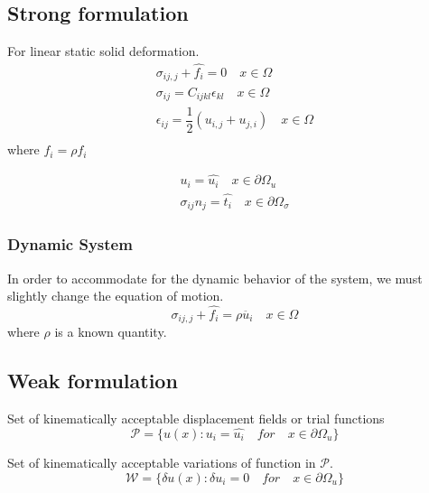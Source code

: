 \documentclass[en]{minipw} %
\begin{document}
\subsection{Strong formulation}
For linear static solid deformation.
\begin{equation}
\begin{aligned}
\sigma_{ij,j} + \hat{f_{i}} = 0 \quad x \in \Omega
\\
\sigma_{ij} = C_{ijkl} \epsilon_{kl} \quad x \in \Omega
\\
\epsilon_{ij} = \dfrac{1}{2}(u_{i,j} + u_{j,i}) \quad x \in \Omega
\\
\end{aligned}
\end{equation}
where $\hat{f_{i}} = \rho f_i$

\begin{equation}
\begin{aligned}
u_i = \hat{u_i} \quad x \in \partial  \Omega_{u}
\\
\sigma_{ij} n_{j} = \hat{t_i} \quad x \in \partial \Omega_{\sigma}
\end{aligned}
\end{equation}

\subsubsection{Dynamic System}
In order to accommodate for the dynamic behavior of the system, we must slightly change the equation of motion.
\begin{equation}
\label{eq:motion_dynamic}
\sigma_{ij,j} + \hat{f_{i}} = \rho \ddot{u_i} \quad x \in \Omega
\end{equation}
where $\rho$ is a known quantity.

\subsection{Weak formulation}

Set of kinematically acceptable displacement fields or trial functions
\begin{equation}
\mathcal{P} = \{ u(x) : u_i = \hat{u_i} \quad for \quad x \in \partial \Omega_{u} \}
\end{equation}

Set of kinematically acceptable variations of function in $\mathcal{P}$.
\begin{equation}
\label{eq:variations}
\mathcal{W} = \{ \delta u(x) : \delta u_i = 0 \quad for \quad x \in \partial \Omega_{u} \}
\end{equation}
\end{document}
